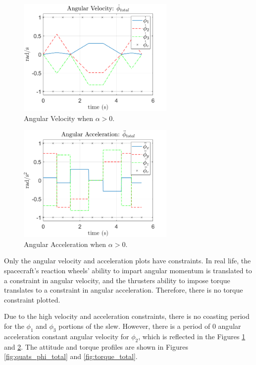\documentclass[letterpaper, preprint, paper,11pt]{AAS}	%
\begin{document}
\begin{multicols}{2}
	\begin{figure}[H]
		\begin{center}
			\includegraphics[width=3in]{figures/alphaNot0/ang_vel_phi_total.png}
			\caption{Angular Velocity when $\alpha>0$.}
			\label{fig:ang_vel_phi_total}
		\end{center}
	\end{figure}
	\columnbreak
	\begin{figure}[H]
		\begin{center}
			\includegraphics[width=3in]{figures/alphaNot0/ang_accel_total.png}
			\caption{Angular Acceleration when $\alpha>0$.}
			\label{fig:ang_accel_total}
		\end{center}
	\end{figure}
\end{multicols}

Only the angular velocity and acceleration plots have constraints. In real life, the spacecraft's reaction wheels' ability to impart angular momentum is translated to a constraint in angular velocity, and the thrusters ability to impose torque translates to a constraint in angular acceleration. Therefore, there is no torque constraint plotted. 

Due to the high velocity and acceleration constraints, there is no coasting period for the $\phi_1$ and $\phi_3$ portions of the slew. However, there is a period of 0 angular acceleration constant angular velocity for $\phi_2$, which is reflected in the Figures \ref{fig:ang_vel_phi_total} and \ref{fig:ang_accel_total}. The attitude and torque profiles are shown in Figures \ref{fig:quats_phi_total} and \ref{fig:torque_total}. 
\end{document}
